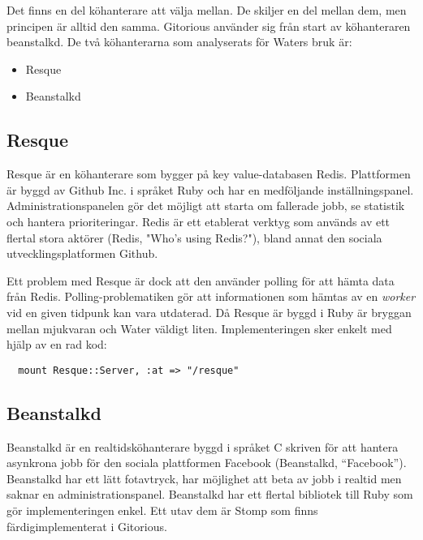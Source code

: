 Det finns en del köhanterare att välja mellan. De skiljer en del mellan dem, men principen är alltid den samma. Gitorious använder sig från start av köhanteraren beanstalkd.
De två köhanterarna som analyserats för Waters bruk är:

\begin{itemize}
  \item Resque
  \item Beanstalkd
\end{itemize}

\subsection{Resque}

Resque är en köhanterare som bygger på key value-databasen Redis. Plattformen är byggd av Github Inc. i språket Ruby och har en medföljande inställningspanel. Administrationspanelen gör det möjligt att starta om fallerade jobb, se statistik och hantera prioriteringar. Redis är ett etablerat verktyg som används av ett flertal stora aktörer (Redis, "Who's using Redis?"), bland annat den sociala utvecklingsplatformen Github.

Ett problem med Resque är dock att den använder polling för att hämta data från Redis. Polling-problematiken gör att informationen som hämtas av en \emph{worker} vid en given tidpunk kan vara utdaterad. Då Resque är byggd i Ruby är bryggan mellan mjukvaran och Water väldigt liten. Implementeringen sker enkelt med hjälp av en rad kod:

\begin{verbatim}
  mount Resque::Server, :at => "/resque"
\end{verbatim}

\subsection{Beanstalkd}
Beanstalkd är en realtidsköhanterare byggd i språket C skriven för att hantera asynkrona jobb för den sociala plattformen Facebook (Beanstalkd, “Facebook”). Beanstalkd har ett lätt fotavtryck, har möjlighet att beta av jobb i realtid men saknar en administrationspanel.
Beanstalkd har ett flertal bibliotek till Ruby som gör implementeringen enkel. Ett utav dem är Stomp som finns färdigimplementerat i Gitorious.
